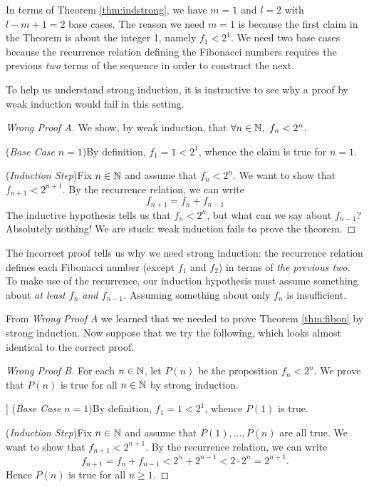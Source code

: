 In terms of Theorem \ref{thm:indstrong}, we have $m=1$ and $l=2$ with $l-m+1=2$ base cases. The reason we need $m=1$ is because the first claim in the Theorem is about the integer 1, namely $f_1<2^1$. We need two base cases because the recurrence relation defining the Fibonacci numbers requires the previous \emph{two} terms of the sequence in order to construct the next.\par

To help us understand strong induction, it is instructive to see why a proof by weak induction would fail in this setting.

\begin{proof}[Wrong Proof A]
	We show, by weak induction, that $\forall n\in\mathbb{N},\ f_n<2^n$.\par
	(\emph{Base Case} $n=1$)\quad By definition, $f_1=1<2^1$, whence the claim is true for $n=1$.\par
	(\emph{Induction Step})\quad Fix $n\in\mathbb{N}$ and assume that $f_n<2^n$. We want to show that $f_{n+1}<2^{n+1}$. By the recurrence relation, we can write
	\[
		f_{n+1}=f_n+f_{n-1}\tag*{($\ast$)}
	\]
	The inductive hypothesis tells us that $f_n<2^n$, but what can we say about $f_{n-1}$? Absolutely nothing! We are stuck: weak induction fails to prove the theorem.
\end{proof}

The incorrect proof tells us why we need strong induction: the recurrence relation defines each Fibonacci number (except $f_1$ and $f_2$) in terms of \emph{the previous two.} To make use of the recurrence, our induction hypothesis must assume something about \emph{at least $f_n$ and $f_{n-1}$.} Assuming something about only $f_n$ is insufficient.\par

From \emph{Wrong Proof A} we learned that we needed to prove Theorem \ref{thm:fibon} by strong induction. Now suppose that we try the following, which looks almost identical to the correct proof.

\begin{proof}[Wrong Proof B]
	For each $n\in\mathbb{N}$, let $P(n)$ be the proposition $f_n<2^n$. We prove that $P(n)$ is true for all $n\in\mathbb{N}$ by strong induction.\par]
	(\emph{Base Case} $n=1$)\quad By definition, $f_1=1<2^1$, whence $P(1)$ is true.\par
	(\emph{Induction Step})\quad Fix $n\in\mathbb{N}$ and assume that $P(1),\ldots,P(n)$ are all true. We want to show that $f_{n+1}<2^{n+1}$. By the recurrence relation, we can write
	\[
		f_{n+1}=f_n+f_{n-1}<2^n+2^{n-1}<2\cdot 2^n=2^{n+1}.\tag*{($\dag$)}
	\]
	Hence $P(n)$ is true for all $n\ge 1$.
\end{proof}

